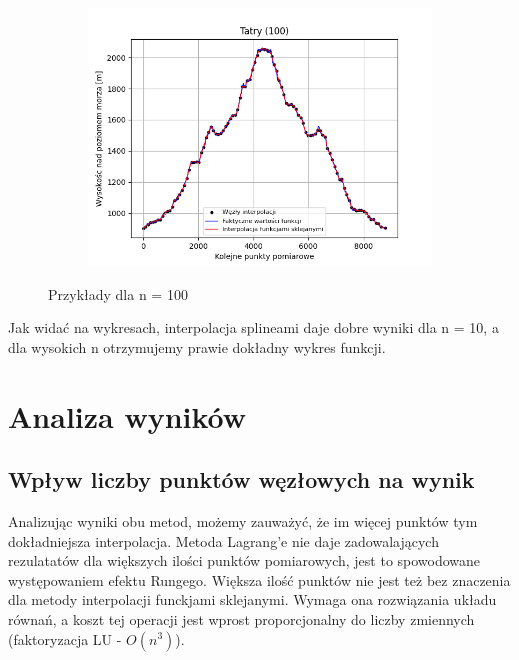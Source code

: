 \documentclass[fleqn]{article}
\begin{document}
\begin{figure}[h]
\begin{subfigure}{.33\textwidth}
          \includegraphics[width=\linewidth]{plot_100_points_Tatry.png}
          \label{fig:sub3}
        \end{subfigure}
        \caption{Przykłady dla n = 100}
        \label{fig:test}
    \end{figure}

    Jak widać na wykresach, interpolacja splineami daje dobre wyniki dla n = 10, a dla wysokich n otrzymujemy prawie dokładny wykres funkcji.

\section{Analiza wyników}
\subsection{Wpływ liczby punktów węzłowych na wynik}
    Analizując wyniki obu metod, możemy zauważyć, że im więcej punktów tym dokładniejsza interpolacja. 
    Metoda Lagrang'e nie daje zadowalających rezulatatów dla większych ilości punktów pomiarowych,
    jest to spowodowane występowaniem efektu Rungego. Większa ilość punktów nie jest też bez znaczenia dla metody interpolacji
    funckjami sklejanymi. Wymaga ona rozwiązania układu równań, a koszt tej operacji jest wprost proporcjonalny do liczby zmiennych (faktoryzacja LU - $O(n^3)$).
    
\end{document}
